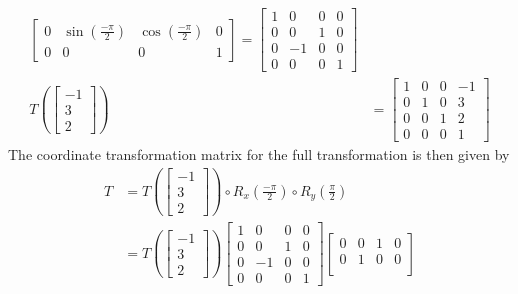 \documentclass[10pt]{article}
\begin{document}
\begin{enumerate}
\begin{align*}
\begin{bmatrix}
                0 & \sin{\left(\frac{-\pi}{2}\right)} & \cos{\left(\frac{-\pi}{2}\right)} & 0 \\
                0 & 0 & 0 & 1
            \end{bmatrix} = \begin{bmatrix}
                1 & 0 & 0 & 0 \\
                0 & 0 & 1 & 0 \\
                0 & -1 & 0 & 0 \\
                0 & 0 & 0 & 1
            \end{bmatrix} \\
            T\left(\begin{bmatrix} -1 \\ 3 \\ 2 \end{bmatrix}\right) &= \begin{bmatrix}
                1 & 0 & 0 & -1 \\
                0 & 1 & 0 & 3 \\
                0 & 0 & 1 & 2 \\
                0 & 0 & 0 & 1
            \end{bmatrix}
        \end{align*}
        The coordinate transformation matrix for the full transformation is then given by
        \begin{align*}
            T &= T\left(\begin{bmatrix} -1 \\ 3 \\ 2 \end{bmatrix}\right) \circ
                R_{x}\left(\frac{-\pi}{2}\right) \circ R_{y}\left(\frac{\pi}{2}\right) \\
            &= T\left(\begin{bmatrix} -1 \\ 3 \\ 2 \end{bmatrix}\right) \begin{bmatrix}
                1 & 0 & 0 & 0 \\
                0 & 0 & 1 & 0 \\
                0 & -1 & 0 & 0 \\
                0 & 0 & 0 & 1
            \end{bmatrix} \begin{bmatrix}
                0 & 0 & 1 & 0 \\
                0 & 1 & 0 & 0 \\

\end{bmatrix}
\end{align*}
\end{enumerate}
\end{document}
